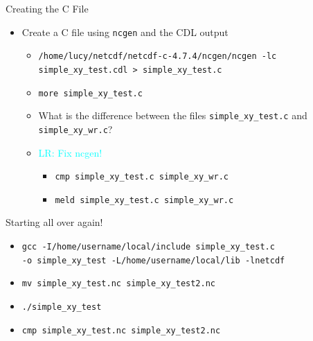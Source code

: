 \documentclass[compress,11pt,xcolor=svgnames,aspectratio=169]{beamer}
\newcommand{\lr}[1]{\textcolor{cyan}{LR: #1}}
\begin{document}
\begin{frame}[fragile]{Creating the C File}

\begin{itemize}
\setlength\itemsep{0.4cm}

  \item Create a C file using \texttt{ncgen} and the CDL output\\[0.4cm]

  \begin{itemize}
  \setlength\itemsep{0.5cm}

    \item \verb|/home/lucy/netcdf/netcdf-c-4.7.4/ncgen/ncgen -lc simple_xy_test.cdl > simple_xy_test.c|
    \item \verb|more simple_xy_test.c|
    \item What is the difference between the files \verb|simple_xy_test.c| and \verb|simple_xy_wr.c|?
    \item \lr{Fix ncgen!}

    \begin{itemize}
      \item \verb|cmp simple_xy_test.c simple_xy_wr.c|
      \item \verb|meld simple_xy_test.c simple_xy_wr.c|
    \end{itemize}

  \end{itemize}

\end{itemize}

\end{frame}

\begin{frame}[fragile]{Starting all over again!}

\begin{itemize}
  \setlength\itemsep{0.5cm}

  \item \verb|gcc -I/home/username/local/include simple_xy_test.c|\\
  \verb|-o simple_xy_test -L/home/username/local/lib -lnetcdf|
  \item \verb|mv simple_xy_test.nc simple_xy_test2.nc|
  \item \verb|./simple_xy_test|
  \item \verb|cmp simple_xy_test.nc simple_xy_test2.nc|

\end{itemize}

\end{frame}
\end{document}
